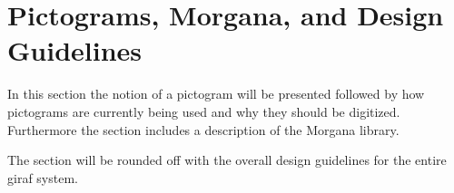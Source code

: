 \section{Pictograms, Morgana, and Design Guidelines}
In this section the notion of a pictogram will be presented followed by how pictograms are currently being used and why they should be digitized. Furthermore the section includes a description of the Morgana library.

The section will be rounded off with the overall design guidelines for the entire \ac{giraf} system.
